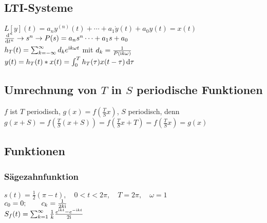 \documentclass[german,color,6pt]{latex4ei/latex4ei_fs}
\begin{document}
\begin{sectionbox}
	\subsection{LTI-Systeme}
	$L[y](t) = a_n y^{(n)}(t) + \cdots + a_1 \dot{y}(t) + a_0 y(t) = x(t)$\\
	$\frac{\diff^n}{\diff t^n} \ra s^n \ra P(s) = a_n s^n \cdots + a_1 s + a_0$\\
	$h_T(t) = \sum_{k=-\infty}^{\infty}d_k e^{\mathrm{i} k \omega t}$ mit $d_k = \frac{1}{P(\mathrm{i} k \omega)}$\\
	$y(t) = h_T(t)*x(t) = \int_0^T h_T(\tau) x(t - \tau) \diff \tau$
\end{sectionbox}

\begin{sectionbox}
	\subsection{Umrechnung von $T$ in $S$ periodische Funktionen}
	$f$ ist $T$ periodisch, $g(x) = f\left( \frac{T}{S} x \right)$, $S$ periodisch, denn
	$g(x+S) = f\left( \frac{T}{S} (x+S) \right) = f\left( \frac{T}{S} x + T \right) = f\left( \frac{T}{S} x \right) = g(x)$\\
\end{sectionbox}

\begin{sectionbox}
	\subsection{Funktionen}
	\subsubsection{Sägezahnfunktion}
	$s(t) = \frac{1}{2}(\pi - t), \quad 0 < t < 2 \pi, \quad T = 2 \pi, \quad \omega = 1$\\
	$c_0 = 0; \qquad c_k = \frac{1}{2k \mathrm{i}}$\\
	$S_f(t) = \sum_{k=1}^{\infty}\frac{1}{k}\frac{e^{\mathrm{i} k t} - e^{-\mathrm{i} k t}}{2 \mathrm{i}}$
\end{sectionbox}


\end{document}
